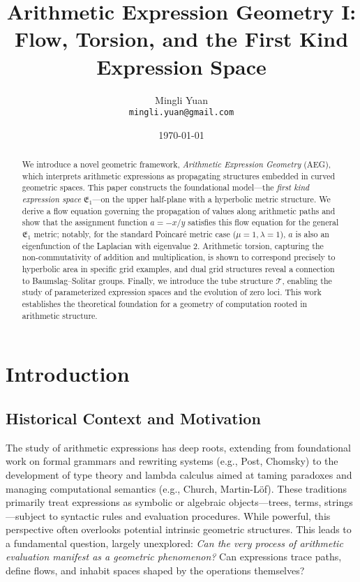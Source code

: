 \documentclass[12pt]{article}
\title{Arithmetic Expression Geometry I: Flow, Torsion, and the First Kind Expression Space}
\author{Mingli Yuan \\ %
        \texttt{mingli.yuan@gmail.com}} %
\date{\today} %
\begin{document}
\maketitle

\begin{abstract}
We introduce a novel geometric framework, \emph{Arithmetic Expression Geometry} (AEG), which interprets arithmetic expressions as propagating structures embedded in curved geometric spaces. This paper constructs the foundational model---the \emph{first kind expression space} \( \mathfrak{E}_1 \)---on the upper half-plane with a hyperbolic metric structure. We derive a flow equation governing the propagation of values along arithmetic paths and show that the assignment function \( a = -x/y \) satisfies this flow equation for the general \( \mathfrak{E}_1 \) metric; notably, for the standard Poincaré metric case (\(\mu=1, \lambda=1\)), \(a\) is also an eigenfunction of the Laplacian with eigenvalue 2. Arithmetic torsion, capturing the non-commutativity of addition and multiplication, is shown to correspond precisely to hyperbolic area in specific grid examples, and dual grid structures reveal a connection to Baumslag--Solitar groups. Finally, we introduce the tube structure \( \mathcal{T} \), enabling the study of parameterized expression spaces and the evolution of zero loci. This work establishes the theoretical foundation for a geometry of computation rooted in arithmetic structure.
\end{abstract}


\tableofcontents
\newpage %

\section{Introduction}

\subsection{Historical Context and Motivation}
The study of arithmetic expressions has deep roots, extending from foundational work on formal grammars and rewriting systems (e.g., Post\cite{Post1943FormalRO}, Chomsky\cite{Chomsky1956ThreeMF}) to the development of type theory and lambda calculus aimed at taming paradoxes and managing computational semantics (e.g., Church\cite{Church1940AFO}, Martin-L\"{o}f\cite{MartinLf1975AnIT}). These traditions primarily treat expressions as symbolic or algebraic objects—trees, terms, strings—subject to syntactic rules and evaluation procedures. While powerful, this perspective often overlooks potential intrinsic geometric structures. This leads to a fundamental question, largely unexplored: \textit{Can the very process of arithmetic evaluation manifest as a geometric phenomenon?} Can expressions trace paths, define flows, and inhabit spaces shaped by the operations themselves?
\end{document}
